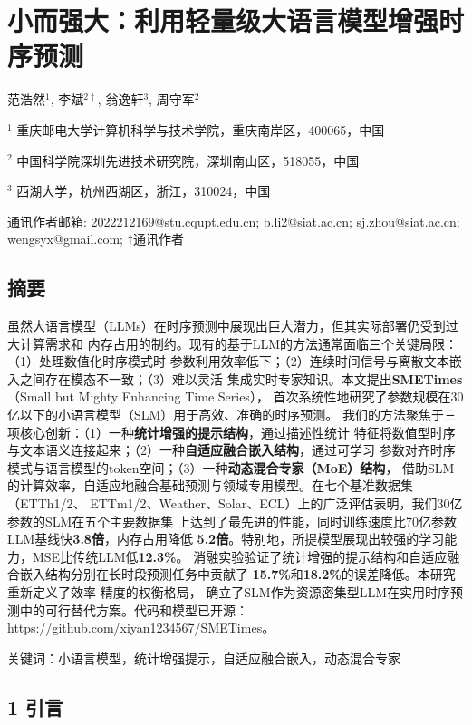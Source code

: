 \documentclass[
  10
]{article}
\author{}
\date{}
\begin{document}
\section{小而强大：利用轻量级大语言模型增强时序预测}
\label{small-but-mighty-enhancing-time-series-forecasting-with-lightweight-llms}

范浩然$^{1}$, 李斌$^{2\dagger}$, 翁逸轩$^{3}$, 周守军$^{2}$

$^{1}$ 重庆邮电大学计算机科学与技术学院，重庆南岸区，400065，中国

$^{2}$ 中国科学院深圳先进技术研究院，深圳南山区，518055，中国

$^{3}$ 西湖大学，杭州西湖区，浙江，310024，中国

通讯作者邮箱: 2022212169@stu.cqupt.edu.cn; b.li2@siat.ac.cn;
sj.zhou@siat.ac.cn; wengsyx@gmail.com; $\dagger$通讯作者

\subsection{摘要}\label{abstract}

虽然大语言模型（LLMs）在时序预测中展现出巨大潜力，但其实际部署仍受到过大计算需求和
内存占用的制约。现有的基于LLM的方法通常面临三个关键局限：（1）处理数值化时序模式时
参数利用效率低下；（2）连续时间信号与离散文本嵌入之间存在模态不一致；（3）难以灵活
集成实时专家知识。本文提出\textbf{SMETimes}（Small but Mighty Enhancing Time Series），
首次系统性地研究了参数规模在30亿以下的小语言模型（SLM）用于高效、准确的时序预测。
我们的方法聚焦于三项核心创新：（1）一种\textbf{统计增强的提示结构}，通过描述性统计
特征将数值型时序与文本语义连接起来；（2）一种\textbf{自适应融合嵌入结构}，通过可学习
参数对齐时序模式与语言模型的token空间；（3）一种\textbf{动态混合专家（MoE）结构}，
借助SLM的计算效率，自适应地融合基础预测与领域专用模型。在七个基准数据集（ETTh1/2、
ETTm1/2、Weather、Solar、ECL）上的广泛评估表明，我们30亿参数的SLM在五个主要数据集
上达到了最先进的性能，同时训练速度比70亿参数LLM基线快\textbf{3.8倍}，内存占用降低
\textbf{5.2倍}。特别地，所提模型展现出较强的学习能力，MSE比传统LLM低\textbf{12.3\%}。
消融实验验证了统计增强的提示结构和自适应融合嵌入结构分别在长时段预测任务中贡献了
\textbf{15.7\%}和\textbf{18.2\%}的误差降低。本研究重新定义了效率-精度的权衡格局，
确立了SLM作为资源密集型LLM在实用时序预测中的可行替代方案。代码和模型已开源：
https://github.com/xiyan1234567/SMETimes。

关键词：小语言模型，统计增强提示，自适应融合嵌入，动态混合专家

\subsection{1 引言}\label{introduction}
\end{document}
